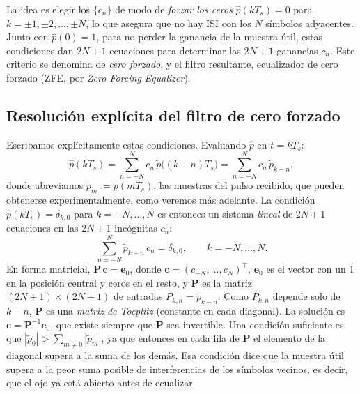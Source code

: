 La idea es elegir los $\{c_n\}$ de modo de \emph{forzar los ceros} $\hat{p}(kT_s) = 0$ para $k=\pm 1, \pm 2,\ldots,\pm N$, lo que asegura que no hay ISI con los $N$ símbolos adyacentes. Junto con $\hat p(0)=1$, para no perder la ganancia de la muestra útil, estas condiciones dan $2N+1$ ecuaciones para determinar las $2N+1$ ganancias $c_n$. Este criterio se denomina de \emph{cero forzado}, y el filtro resultante, ecualizador de cero forzado (ZFE, por \emph{Zero Forcing Equalizer}).

\subsection*{Resolución explícita del filtro de cero forzado}

Escribamos explícitamente estas condiciones. Evaluando $\hat p$ en $t=kT_s$:
\begin{equation*}
    \hat p(kT_s) = \sum_{n=-N}^N c_n\, \tilde p\big((k-n)T_s\big) = \sum_{n=-N}^N c_n\, \tilde p_{k-n},
\end{equation*}
donde abreviamos $\tilde p_m := \tilde p(mT_s)$, las muestras del pulso recibido, que pueden obtenerse experimentalmente, como veremos más adelante. La condición $\hat p(kT_s)=\delta_{k,0}$ para $k=-N,\ldots,N$ es entonces un sistema \emph{lineal} de $2N+1$ ecuaciones en las $2N+1$ incógnitas $c_n$:
\begin{equation}\label{eq:sistema zfe}
    \sum_{n=-N}^N \tilde p_{k-n}\, c_n = \delta_{k,0}, \qquad k=-N,\ldots,N.
\end{equation}
En forma matricial, $\mathbf P\,\mathbf c = \mathbf e_0$, donde $\mathbf c=(c_{-N},\ldots,c_N)^\top$, $\mathbf e_0$ es el vector con un $1$ en la posición central y ceros en el resto, y $\mathbf P$ es la matriz $(2N+1)\times(2N+1)$ de entradas $P_{k,n}=\tilde p_{k-n}$. Como $P_{k,n}$ depende solo de $k-n$, $\mathbf P$ es una \emph{matriz de Toeplitz} (constante en cada diagonal). La solución es $\mathbf c = \mathbf P^{-1}\mathbf e_0$, que existe siempre que $\mathbf P$ sea invertible. Una condición suficiente es que $|\tilde p_0|>\sum_{m\neq 0}|\tilde p_m|$, ya que entonces en cada fila de $\mathbf P$ el elemento de la diagonal supera a la suma de los demás. Esa condición dice que la muestra útil supera a la peor suma posible de interferencias de los símbolos vecinos, es decir, que el ojo ya está abierto antes de ecualizar.

